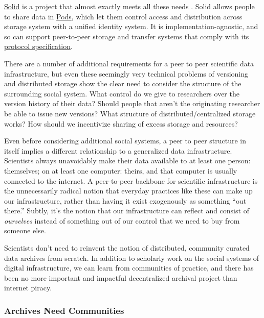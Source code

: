 \documentclass[10pt]{article}
\begin{document}
\begin{multicols}{2}
\href{https://solidproject.org/}{Solid} is a project that almost exactly
meets all these needs \cite{capadisliSolidProtocol2020, sambraSolidPlatformDecentralized2016, SolidP2PFoundation} . Solid
allows people to share data in
\href{https://solidproject.org/about}{Pods}, which let them control
access and distribution across storage system with a unified identity
system. It is implementation-agnostic, and so can support peer-to-peer
storage and transfer systems that comply with its
\href{https://solidproject.org/TR/protocol}{protocol specification}.

There are a number of additional requirements for a peer to peer
scientific data infrastructure, but even these seemingly very technical
problems of versioning and distributed storage show the clear need to
consider the structure of the surrounding social system. What control do
we give to researchers over the version history of their data? Should
people that aren't the originating researcher be able to issue new
versions? What structure of distributed/centralized storage works? How
should we incentivize sharing of excess storage and resources?

Even before considering additional social systems, a peer to peer
structure in itself implies a different relationship to a generalized
data infrastructure. Scientists always unavoidably make their data
available to at least one person: themselves; on at least one computer:
theirs, and that computer is usually connected to the internet. A
peer-to-peer backbone for scientific infrastructure is the unnecessarily
radical notion that everyday practices like these can make up our
infrastructure, rather than having it exist exogenously as something
``out there.'' Subtly, it's the notion that our infrastructure can
reflect and consist of \emph{ourselves} instead of something out of our
control that we need to buy from someone else.

Scientists don't need to reinvent the notion of distributed, community
curated data archives from scratch. In addition to scholarly work on the
social systems of digital infrastructure, we can learn from communities
of practice, and there has been no more important and impactful
decentralized archival project than internet piracy.

\hypertarget{archives-need-communities}{%
\subsubsection{Archives Need
Communities}\label{archives-need-communities}}


\end{multicols}
\end{document}
